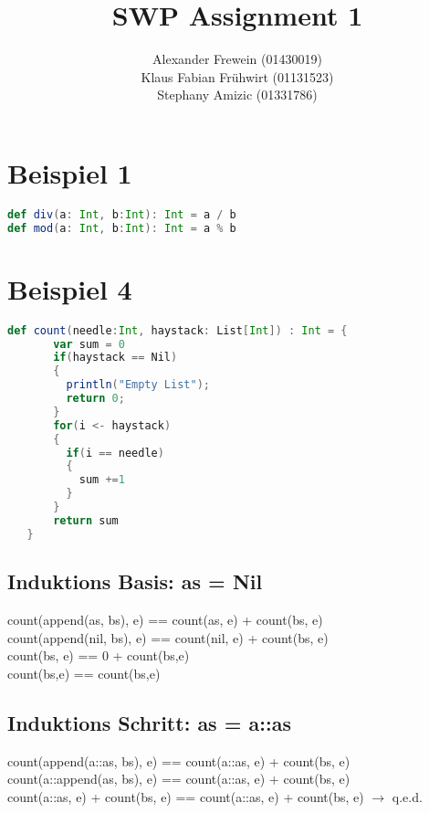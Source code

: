 \documentclass[12pt,runningheads,a4paper]{llncs}
\begin{document}
\title{SWP Assignment 1}


%
%
\author{Alexander Frewein (01430019)\\
		Klaus Fabian Frühwirt (01131523)\\
		Stephany Amizic (01331786)}

%




\maketitle




\bigskip
\bigskip
\section*{Beispiel 1}
\begin{lstlisting}[language=scala]
def div(a: Int, b:Int): Int = a / b
def mod(a: Int, b:Int): Int = a % b
\end{lstlisting}
\section*{Beispiel 4}
\begin{lstlisting}[language=scala]
    def count(needle:Int, haystack: List[Int]) : Int = {
       var sum = 0
       if(haystack == Nil)
       {
         println("Empty List");   
         return 0; 
       }
       for(i <- haystack)
       {
         if(i == needle)
         {
           sum +=1
         }
       }
       return sum
   }  
\end{lstlisting}
\subsection*{Induktions Basis:   as = Nil}
count(append(as, bs), e) == count(as, e) + count(bs, e)\\
count(append(nil, bs), e) == count(nil, e) + count(bs, e)\\
count(bs, e) == 0 + count(bs,e)\\
count(bs,e) == count(bs,e)


\subsection*{Induktions Schritt:   as = a::as}
count(append(a::as, bs), e) == count(a::as, e) + count(bs, e)\\
count(a::append(as, bs), e) == count(a::as, e) + count(bs, e)\\
count(a::as, e) + count(bs, e) == count(a::as, e) + count(bs, e) $\rightarrow$ q.e.d.
\end{document}
